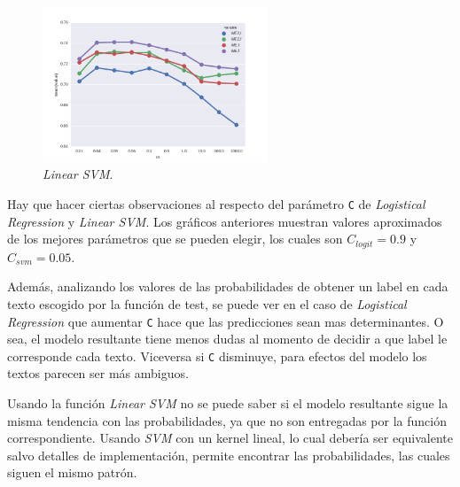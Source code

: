 \documentclass[11pt,letterpaper]{article}
\begin{document}
\begin{figure}[H]
\centering
\includegraphics[width=0.6\textwidth]{p2_svm_logit.png}
\caption{\emph{Linear SVM}.}
\end{figure} 

Hay que hacer ciertas observaciones al respecto del parámetro \texttt{C} de
\emph{Logistical Regression} y \emph{Linear SVM}. Los gráficos anteriores muestran
valores aproximados de los mejores parámetros que se pueden elegir, los
cuales son \(C_{logit} = 0.9\) y \(C_{svm} = 0.05\). 

Además, analizando los valores de las probabilidades de obtener un label en
cada texto escogido por la función de test, se puede ver en el caso de
\emph{Logistical Regression} que aumentar \texttt{C} hace que las predicciones sean mas
determinantes. O sea, el modelo resultante tiene menos dudas al momento de
decidir a que label le corresponde cada texto. Viceversa si \texttt{C} disminuye,
para efectos del modelo los textos parecen ser más ambiguos. 

Usando la función \emph{Linear SVM} no se puede saber si el modelo resultante
sigue la misma tendencia con las probabilidades, ya que no son entregadas por
la función correspondiente. Usando \emph{SVM} con un kernel lineal, lo cual
debería ser equivalente salvo detalles de implementación, permite encontrar
las probabilidades, las cuales siguen el mismo patrón.
\end{document}

